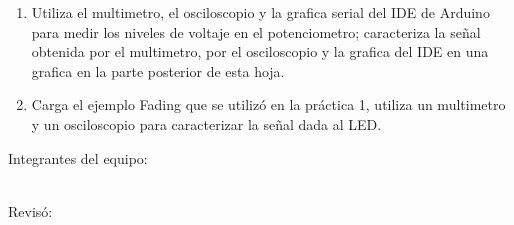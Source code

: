 \begin{enumerate}
		\item Utiliza el multimetro, el osciloscopio y la grafica serial del IDE de Arduino para medir los niveles de voltaje en el potenciometro; caracteriza la señal obtenida por el multimetro, por el osciloscopio y la grafica del IDE en una grafica en la parte posterior de esta hoja.

		\item Carga el ejemplo Fading que se utilizó en la práctica 1, utiliza un multimetro y un osciloscopio para caracterizar la señal dada al LED.
	\end{enumerate}

	\begin{multicols}{2}
		Integrantes del equipo: \\[0.4cm]
		\horrule{0.5pt} \\[0.4cm] %
		\horrule{0.5pt} %

		Revisó: \\[1.25cm]
		\horrule{0.5pt} \\%
	\end{multicols}




